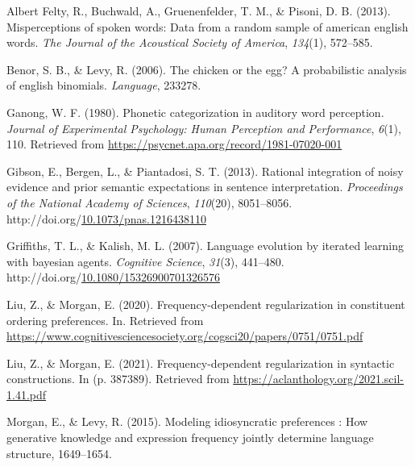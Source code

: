 \documentclass[10pt, letterpaper]{article}
\newenvironment{CSLReferences}%
  {}%
  {\par}
\begin{document}
\hypertarget{refs}{}
\begin{CSLReferences}{1}{0}
\leavevmode{}%
Albert Felty, R., Buchwald, A., Gruenenfelder, T. M., \& Pisoni, D. B.
(2013). Misperceptions of spoken words: Data from a random sample of
american english words. \emph{The Journal of the Acoustical Society of
America}, \emph{134}(1), 572--585.

\leavevmode{}%
Benor, S. B., \& Levy, R. (2006). The chicken or the egg? A
probabilistic analysis of english binomials. \emph{Language}, 233278.

\leavevmode{}%
Ganong, W. F. (1980). Phonetic categorization in auditory word
perception. \emph{Journal of Experimental Psychology: Human Perception
and Performance}, \emph{6}(1), 110. Retrieved from
\url{https://psycnet.apa.org/record/1981-07020-001}

\leavevmode{}%
Gibson, E., Bergen, L., \& Piantadosi, S. T. (2013). Rational
integration of noisy evidence and prior semantic expectations in
sentence interpretation. \emph{Proceedings of the National Academy of
Sciences}, \emph{110}(20), 8051--8056.
http://doi.org/\href{https://doi.org/10.1073/pnas.1216438110}{10.1073/pnas.1216438110}

\leavevmode{}%
Griffiths, T. L., \& Kalish, M. L. (2007). Language evolution by
iterated learning with bayesian agents. \emph{Cognitive Science},
\emph{31}(3), 441--480.
http://doi.org/\href{https://doi.org/10.1080/15326900701326576}{10.1080/15326900701326576}

\leavevmode{}%
Liu, Z., \& Morgan, E. (2020). Frequency-dependent regularization in
constituent ordering preferences. In. Retrieved from
\url{https://www.cognitivesciencesociety.org/cogsci20/papers/0751/0751.pdf}

\leavevmode{}%
Liu, Z., \& Morgan, E. (2021). Frequency-dependent regularization in
syntactic constructions. In (p. 387389). Retrieved from
\url{https://aclanthology.org/2021.scil-1.41.pdf}

\leavevmode{}%
Morgan, E., \& Levy, R. (2015). Modeling idiosyncratic preferences : How
generative knowledge and expression frequency jointly determine language
structure, 1649--1654.


\end{CSLReferences}
\end{document}
